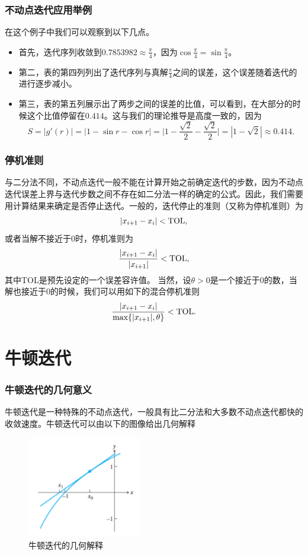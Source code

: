 \documentclass[10pt]{beamer}
\begin{document}
\begin{frame}
\frametitle{不动点迭代应用举例}
在这个例子中我们可以观察到以下几点。
\begin{itemize}
\item 首先，迭代序列收敛到$0.7853982 \approx \frac{\pi}{4}$，因为$\cos  \frac{\pi}{4} = \sin  \frac{\pi}{4}$。
\item 第二，表的第四列列出了迭代序列与真解$\frac{\pi}{4}$之间的误差，这个误差随着迭代的进行逐步减小。
\item 第三，表的第五列展示出了两步之间的误差的比值，可以看到，在大部分的时候这个比值停留在$0.414$。这与我们的理论推导是高度一致的，因为
\begin{equation}
S = |g'(r)| = |1 - \sin r - \cos r| = \Big|1- \frac{\sqrt{2}}{2} - \frac{\sqrt{2}}{2} \Big| = |1- \sqrt{2}| \approx 0.414.
\end{equation}
\end{itemize}
\end{frame}

\begin{frame}
\frametitle{停机准则}
与二分法不同，不动点迭代一般不能在计算开始之前确定迭代的步数，因为不动点迭代误差上界与迭代步数之间不存在如二分法一样的确定的公式。因此，我们需要用计算结果来确定是否停止迭代。一般的，迭代停止的准则（又称为停机准则）为
\begin{equation}
|x_{i+1} - x_i| < \rm{TOL},
\end{equation}
或者当解不接近于$0$时，停机准则为
\begin{equation}
\frac{|x_{i+1} - x_i|}{|x_{i+1}|} < \rm{TOL},
\end{equation}
其中TOL是预先设定的一个误差容许值。
当然，设$\theta>0$是一个接近于$0$的数，当解也接近于$0$的时候，我们可以用如下的混合停机准则
\begin{equation}
\frac{|x_{i+1} - x_i|}{\max\{|x_{i+1}|,\theta\}} < \rm{TOL}.
\end{equation}


\end{frame}





\section{牛顿迭代}

\begin{frame}
\frametitle{牛顿迭代的几何意义}
牛顿迭代是一种特殊的不动点迭代，一般具有比二分法和大多数不动点迭代都快的收敛速度。牛顿迭代可以由以下的图像给出几何解释
\begin{figure}
\includegraphics[width=5cm]{figs/Newton_geometry_1.png} 
\caption{牛顿迭代的几何解释} 
\end{figure}
\end{frame}
\end{document}
